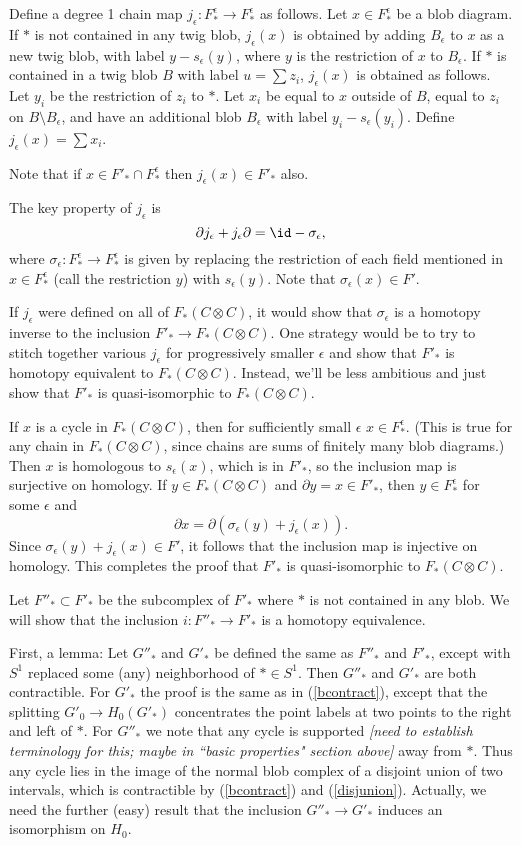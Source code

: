 \documentclass[11pt,leqno]{article}
\def\bd{\partial}
\def\sub{\subset}
\def\setmin{\setminus}
\def\ep{\epsilon}
\def\nn#1{{{\it \small [#1]}}}
\newcommand{\eq}[1]{\begin{displaymath}#1\end{displaymath}}
\begin{document}
Define a degree 1 chain map $j_\ep : F^\ep_* \to F^\ep_*$ as follows.
Let $x \in F^\ep_*$ be a blob diagram.
If $*$ is not contained in any twig blob, $j_\ep(x)$ is obtained by adding $B_\ep$ to
$x$ as a new twig blob, with label $y - s_\ep(y)$, where $y$ is the restriction of $x$ to $B_\ep$.
If $*$ is contained in a twig blob $B$ with label $u = \sum z_i$, $j_\ep(x)$ is obtained as follows.
Let $y_i$ be the restriction of $z_i$ to $*$.
Let $x_i$ be equal to $x$ outside of $B$, equal to $z_i$ on $B \setmin B_\ep$, 
and have an additional blob $B_\ep$ with label $y_i - s_\ep(y_i)$.
Define $j_\ep(x) = \sum x_i$.

Note that if $x \in F'_* \cap F^\ep_*$ then $j_\ep(x) \in F'_*$ also.

The key property of $j_\ep$ is
\eq{
	\bd j_\ep + j_\ep \bd = \id - \sigma_\ep ,
}
where $\sigma_\ep : F^\ep_* \to F^\ep_*$ is given by replacing the restriction of each field
mentioned in $x \in F^\ep_*$ (call the restriction $y$) with $s_\ep(y)$.
Note that $\sigma_\ep(x) \in F'$.

If $j_\ep$ were defined on all of $F_*(C\otimes C)$, it would show that $\sigma_\ep$
is a homotopy inverse to the inclusion $F'_* \to F_*(C\otimes C)$.
One strategy would be to try to stitch together various $j_\ep$ for progressively smaller
$\ep$ and show that $F'_*$ is homotopy equivalent to $F_*(C\otimes C)$.
Instead, we'll be less ambitious and just show that 
$F'_*$ is quasi-isomorphic to $F_*(C\otimes C)$.

If $x$ is a cycle in $F_*(C\otimes C)$, then for sufficiently small $\ep$
$x \in F_*^\ep$.
(This is true for any chain in $F_*(C\otimes C)$, since chains are sums of
finitely many blob diagrams.)
Then $x$ is homologous to $s_\ep(x)$, which is in $F'_*$, so the inclusion map
is surjective on homology.
If $y \in F_*(C\otimes C)$ and $\bd y = x \in F'_*$, then $y \in F^\ep_*$ for some $\ep$
and
\eq{
	\bd x = \bd (\sigma_\ep(y) + j_\ep(x)) .
}
Since $\sigma_\ep(y) + j_\ep(x) \in F'$, it follows that the inclusion map is injective on homology.
This completes the proof that $F'_*$ is quasi-isomorphic to $F_*(C\otimes C)$.

\medskip

Let $F''_* \sub F'_*$ be the subcomplex of $F'_*$ where $*$ is not contained in any blob.
We will show that the inclusion $i: F''_* \to F'_*$ is a homotopy equivalence.

First, a lemma:  Let $G''_*$ and $G'_*$ be defined the same as $F''_*$ and $F'_*$, except with
$S^1$ replaced some (any) neighborhood of $* \in S^1$.
Then $G''_*$ and $G'_*$ are both contractible.
For $G'_*$ the proof is the same as in (\ref{bcontract}), except that the splitting
$G'_0 \to H_0(G'_*)$ concentrates the point labels at two points to the right and left of $*$.
For $G''_*$ we note that any cycle is supported \nn{need to establish terminology for this; maybe
in ``basic properties" section above} away from $*$.
Thus any cycle lies in the image of the normal blob complex of a disjoint union
of two intervals, which is contractible by (\ref{bcontract}) and (\ref{disjunion}).
Actually, we need the further (easy) result that the inclusion
$G''_* \to G'_*$ induces an isomorphism on $H_0$.
\end{document}
